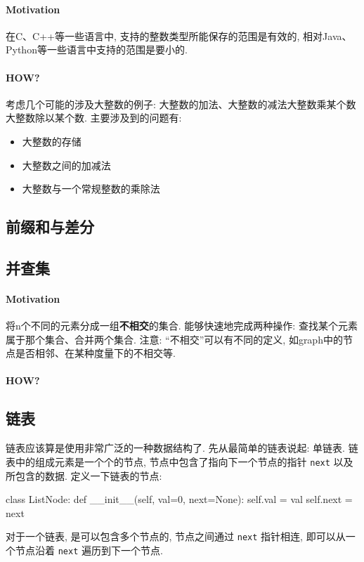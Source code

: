 \paragraph{Motivation}在C、C++等一些语言中, 支持的整数类型所能保存的范围是有效的, 相对Java、Python等一些语言中支持的范围是要小的. 

\paragraph{HOW?}考虑几个可能的涉及大整数的例子: 大整数的加法、大整数的减法大整数乘某个数大整数除以某个数. 主要涉及到的问题有: 
\begin{itemize}
	\item 大整数的存储
	\item 大整数之间的加减法
	\item 大整数与一个常规整数的乘除法
\end{itemize}


\subsection{前缀和与差分}


\subsection{并查集}
\paragraph{Motivation}将n个不同的元素分成一组\textbf{不相交}的集合. 能够快速地完成两种操作: 查找某个元素属于那个集合、合并两个集合. 注意: “不相交”可以有不同的定义, 如graph中的节点是否相邻、在某种度量下的不相交等. 

\paragraph{HOW?}

\subsection{链表}
链表应该算是使用非常广泛的一种数据结构了. 先从最简单的链表说起: 单链表. 链表中的组成元素是一个个的节点, 节点中包含了指向下一个节点的指针 \texttt{next} 以及所包含的数据. 定义一下链表的节点: 
\begin{python}
	class ListNode:
	     def __init__(self, val=0, next=None):
	         self.val = val
	         self.next = next
\end{python}
对于一个链表, 是可以包含多个节点的, 节点之间通过 \texttt{next} 指针相连, 即可以从一个节点沿着 \texttt{next} 遍历到下一个节点. 